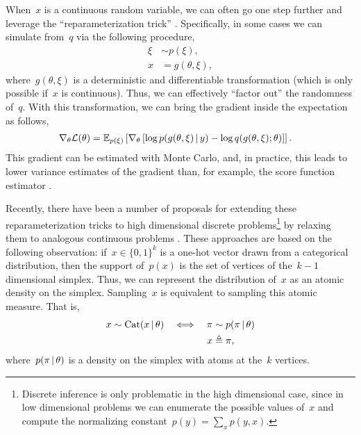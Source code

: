 When~$x$ is a continuous random variable, we can often go one step
further and leverage the ``reparameterization trick''  \citep{Salimans2013,Kingma2014,Price1958,Bonnet1964}.  Specifically,
in some cases we can simulate from~$q$ via the following procedure,
\begin{align}
\xi &\sim p(\xi),  \\
x &= g(\theta, \xi),
\end{align}
where~$g(\theta, \xi)$ is a deterministic and differentiable
transformation (which is only possible if~$x$ is continuous). Thus, we
can effectively ``factor out'' the randomness of~$q$. With this
transformation, we can bring the gradient inside the expectation as
follows,
\begin{align}
  \nabla_\theta \mathcal{L}(\theta) 
  &= \mathbb{E}_{p(\xi)} \left[ \nabla_\theta \left[\log p(g(\theta, \xi) \, | \, y) - \log q(g(\theta, \xi); \theta) \right] \right].
\end{align}
This gradient can be estimated with Monte Carlo, and, in practice,
this leads to lower variance estimates of the gradient than, for
example, the score function estimator \citep{Williams1992,Glynn1990}.




Recently, there have been a number of proposals for extending these
reparameterization tricks to high dimensional discrete
problems\footnote{Discrete inference is only problematic in the high
dimensional case, since in low dimensional problems we can enumerate
the possible values of~$x$ and compute the normalizing constant~$p(y)
= \sum_x p(y, x)$.} by relaxing them to analogous continuous
problems \citep{maddison2016concrete, jang2016categorical,
kusner2016gans}.  These approaches are based on the following
observation: if~$x \in \{0,1\}^k$ is a one-hot vector drawn from a
categorical distribution, then the support of~$p(x)$ is the set of
vertices of the~$k-1$ dimensional simplex.  Thus, we can represent the
distribution of~$x$ as an atomic density on the simplex.  Sampling~$x$
is equivalent to sampling this atomic measure. That is,
\begin{align}
  x &\sim \mathrm{Cat}( x \, | \, \theta) &\iff& & {\pi} &\sim p({\pi} \, | \, \theta) \nonumber \\
  & & & & x &\triangleq {\pi},
\end{align}
where~$p({\pi} \, | \, \theta)$ is a density on the simplex with atoms at
the~$k$ vertices.

